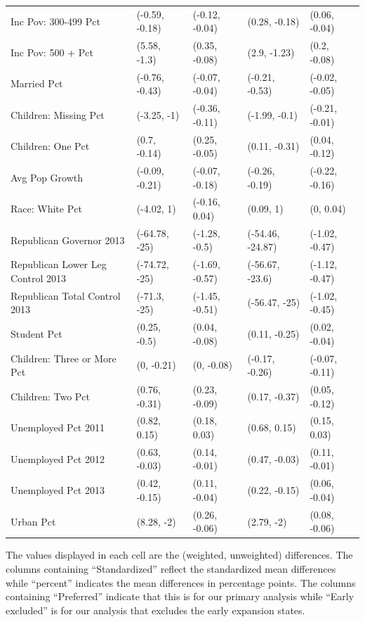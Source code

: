 \begin{landscape}
\begin{table}[h!]
\begin{threeparttable}
\begin{tabular}{lllll}
  Inc Pov: 300-499 Pct & (-0.59, -0.18) & (-0.12, -0.04) & (0.28, -0.18) & (0.06, -0.04) \\ 
  Inc Pov: 500 + Pct & (5.58, -1.3) & (0.35, -0.08) & (2.9, -1.23) & (0.2, -0.08) \\ 
  Married Pct & (-0.76, -0.43) & (-0.07, -0.04) & (-0.21, -0.53) & (-0.02, -0.05) \\ 
  Children: Missing Pct & (-3.25, -1) & (-0.36, -0.11) & (-1.99, -0.1) & (-0.21, -0.01) \\ 
  Children: One Pct & (0.7, -0.14) & (0.25, -0.05) & (0.11, -0.31) & (0.04, -0.12) \\ 
  Avg Pop Growth & (-0.09, -0.21) & (-0.07, -0.18) & (-0.26, -0.19) & (-0.22, -0.16) \\ 
  Race: White Pct & (-4.02, 1) & (-0.16, 0.04) & (0.09, 1) & (0, 0.04) \\ 
  Republican Governor 2013 & (-64.78, -25) & (-1.28, -0.5) & (-54.46, -24.87) & (-1.02, -0.47) \\ 
  Republican Lower Leg Control 2013 & (-74.72, -25) & (-1.69, -0.57) & (-56.67, -23.6) & (-1.12, -0.47) \\ 
  Republican Total Control 2013 & (-71.3, -25) & (-1.45, -0.51) & (-56.47, -25) & (-1.02, -0.45) \\ 
  Student Pct & (0.25, -0.5) & (0.04, -0.08) & (0.11, -0.25) & (0.02, -0.04) \\ 
  Children: Three or More Pct & (0, -0.21) & (0, -0.08) & (-0.17, -0.26) & (-0.07, -0.11) \\ 
  Children: Two Pct & (0.76, -0.31) & (0.23, -0.09) & (0.17, -0.37) & (0.05, -0.12) \\ 
  Unemployed Pct 2011 & (0.82, 0.15) & (0.18, 0.03) & (0.68, 0.15) & (0.15, 0.03) \\ 
  Unemployed Pct 2012 & (0.63, -0.03) & (0.14, -0.01) & (0.47, -0.03) & (0.11, -0.01) \\ 
  Unemployed Pct 2013 & (0.42, -0.15) & (0.11, -0.04) & (0.22, -0.15) & (0.06, -0.04) \\ 
  Urban Pct & (8.28, -2) & (0.26, -0.06) & (2.79, -2) & (0.08, -0.06) \\ 
   \hline
\end{tabular}
    \begin{tablenotes}
      \item[] The values displayed in each cell are the (weighted, unweighted) differences. The columns containing ``Standardized'' reflect the standardized mean differences while ``percent'' indicates the mean differences in percentage points. The columns containing ``Preferred'' indicate that this is for our primary analysis while ``Early excluded'' is for our analysis that excludes the early expansion states.
    \end{tablenotes}
\end{threeparttable}
\end{table}

\end{landscape}

